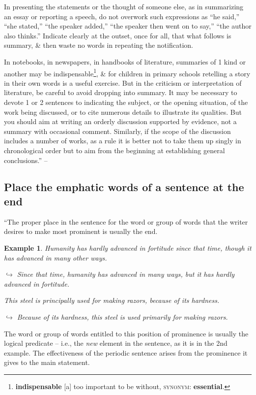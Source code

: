 \documentclass[oneside]{book}
\numberwithin{equation}{section}
\newtheorem{example}{Example}[chapter]
\begin{document}
In presenting the statements or the thought of someone else, as in summarizing an essay or reporting a speech, do not overwork such expressions as ``he said,'' ``she stated,'' ``the speaker added,'' ``the speaker then went on to say,'' ``the author also thinks.'' Indicate clearly at the outset, once for all, that what follows is summary, \& then waste no words in repeating the notification.

In notebooks, in newspapers, in handbooks of literature, summaries of 1 kind or another may be indispensable\footnote{\textbf{indispensable} [a] too important to be without, \textsc{synonym}: \textbf{essential}.}, \& for children in primary schools retelling a story in their own words is a useful exercise. But in the criticism or interpretation of literature, be careful to avoid dropping into summary. It may be necessary to devote 1 or 2 sentences to indicating the subject, or the opening situation, of the work being discussed, or to cite numerous details to illustrate its qualities. But you should aim at writing an orderly discussion supported by evidence, not a summary with occasional comment. Similarly, if the scope of the discussion includes a number of works, as a rule it is better not to take them up singly in chronological order but to aim from the beginning at establishing general conclusions.'' -- \cite[Chap. 2, Sect. 21, pp. 46--47]{Strunk_White2019}

\subsection{Place the emphatic words of a sentence at the end}
``The proper place in the sentence for the word or group of words that the writer desires to make most prominent is usually the end.

\begin{example}
	Humanity has hardly advanced in fortitude since that time, though it has advanced in many other ways.
	
	$\hookrightarrow$ Since that time, humanity has advanced in many ways, but it has hardly advanced in fortitude.
	
	This steel is principally used for making razors, because of its hardness.
	
	$\hookrightarrow$ Because of its hardness, this steel is used primarily for making razors.
\end{example}
The word or group of words entitled to this position of prominence is usually the logical predicate -- i.e., the \textit{new} element in the sentence, as it is in the 2nd example. The effectiveness of the periodic sentence arises from the prominence it gives to the main statement.
\end{document}
